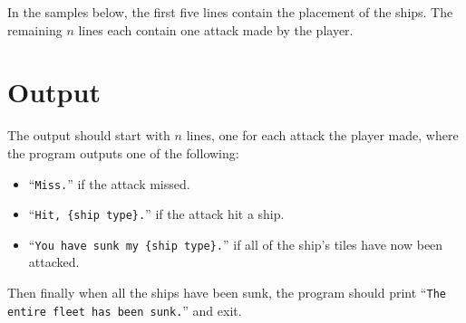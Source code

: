 In the samples below,
the first five lines contain the placement of the ships.
The remaining $n$ lines each contain one attack made by the player.

\section*{Output}
The output should start with $n$ lines, one for each attack the player made,
where the program outputs one of the following:
\begin{itemize}
    \item ``\texttt{Miss.}'' if the attack missed.
    \item ``\texttt{Hit, \{ship type\}.}'' if the attack hit a ship.
    \item ``\texttt{You have sunk my \{ship type\}.}'' if all of the ship's tiles have now been attacked.
\end{itemize}
Then finally when all the ships have been sunk, the program should print ``\texttt{The entire fleet has been sunk.}'' and exit.
